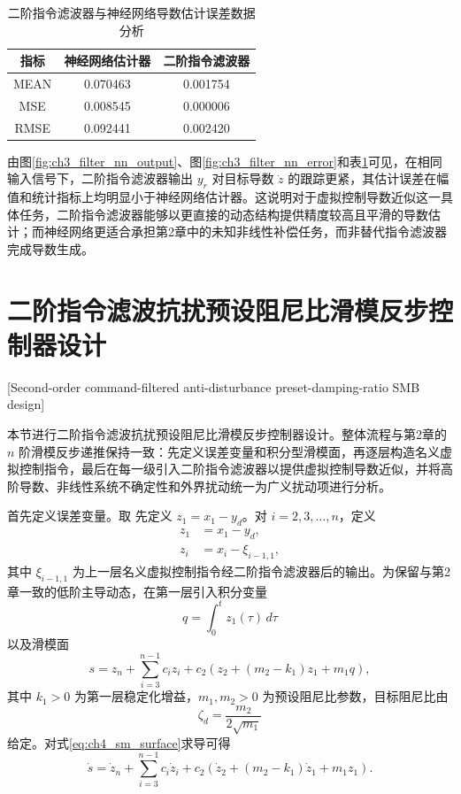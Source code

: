 \begin{table}[htbp]
  \centering
  \caption{二阶指令滤波器与神经网络导数估计误差数据分析}
  \label{tab:ch3_filter_nn_metrics}
  \begin{tabular}{ccc}
    \toprule
    指标 & 神经网络估计器 & 二阶指令滤波器 \\
    \midrule
    MEAN & 0.070463 & 0.001754 \\
    MSE & 0.008545 & 0.000006 \\
    RMSE & 0.092441 & 0.002420 \\
    \bottomrule
  \end{tabular}
\end{table}

由图\ref{fig:ch3_filter_nn_output}、图\ref{fig:ch3_filter_nn_error}和表\ref{tab:ch3_filter_nn_metrics}可见，在相同输入信号下，二阶指令滤波器输出 $y_r$ 对目标导数 $\dot z$ 的跟踪更紧，其估计误差在幅值和统计指标上均明显小于神经网络估计器。这说明对于虚拟控制导数近似这一具体任务，二阶指令滤波器能够以更直接的动态结构提供精度较高且平滑的导数估计；而神经网络更适合承担第2章中的未知非线性补偿任务，而非替代指令滤波器完成导数生成。

\section{二阶指令滤波抗扰预设阻尼比滑模反步控制器设计}[Second-order command-filtered anti-disturbance preset-damping-ratio SMB design]

本节进行二阶指令滤波抗扰预设阻尼比滑模反步控制器设计。整体流程与第2章的 $n$ 阶滑模反步递推保持一致：先定义误差变量和积分型滑模面，再逐层构造名义虚拟控制指令，最后在每一级引入二阶指令滤波器以提供虚拟控制导数近似，并将高阶导数、非线性系统不确定性和外界扰动统一为广义扰动项进行分析。

首先定义误差变量。取
先定义 $z_1=x_1-y_d$。对 $i=2,3,\ldots,n$，定义
\begin{subequations}
\begin{align}
z_1&=x_1-y_d,\\
z_i&=x_i-\xi_{i-1,1},
\end{align}
\end{subequations}
其中 $\xi_{i-1,1}$ 为上一层名义虚拟控制指令经二阶指令滤波器后的输出。为保留与第2章一致的低阶主导动态，在第一层引入积分变量
\begin{equation}
q=\int_0^t z_1(\tau)\,d\tau
\end{equation}
以及滑模面
\begin{equation}\label{eq:ch4_sm_surface}
s=z_n+\sum_{i=3}^{n-1}c_iz_i+c_2\left(z_2+(m_2-k_1)z_1+m_1q\right),
\end{equation}
其中 $k_1>0$ 为第一层稳定化增益，$m_1,m_2>0$ 为预设阻尼比参数，目标阻尼比由
\begin{equation}
\zeta_d=\frac{m_2}{2\sqrt{m_1}}
\end{equation}
给定。对式\eqref{eq:ch4_sm_surface}求导可得
\begin{equation}\label{eq:ch4_sm_dot}
\dot s=\dot z_n+\sum_{i=3}^{n-1}c_i\dot z_i+c_2\left(\dot z_2+(m_2-k_1)\dot z_1+m_1z_1\right).
\end{equation}


